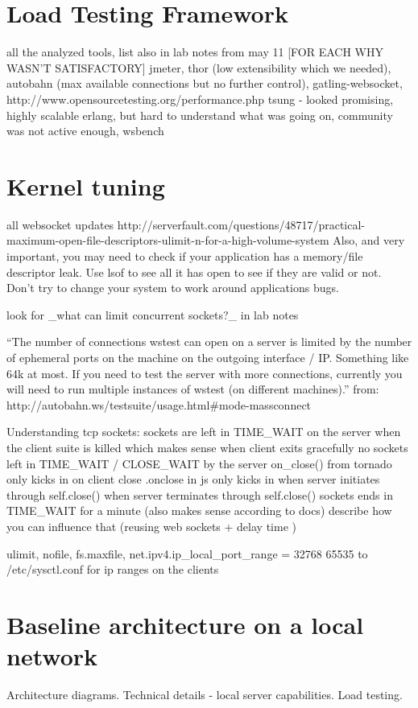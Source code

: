 \documentclass{uvamscse}
\begin{document}
\section{Load Testing Framework}\label{Load Testing Framework}
all the analyzed tools, list also in lab notes from may 11 [FOR EACH WHY WASN'T SATISFACTORY]
jmeter, thor (low extensibility which we needed), autobahn (max available connections but no further control),
gatling-websocket, http://www.opensourcetesting.org/performance.php
tsung - looked promising, highly scalable erlang, but hard to understand what was going on, community was not active enough, wsbench

\section{Kernel tuning}
all websocket updates
http://serverfault.com/questions/48717/practical-maximum-open-file-descriptors-ulimit-n-for-a-high-volume-system
Also, and very important, you may need to check if your application has a memory/file descriptor leak. Use lsof to see all it has open to see if they are valid or not. Don't try to change your system to work around applications bugs.

look for \_what can limit concurrent sockets?\_ in lab notes

“The number of connections wstest can open on a server is limited by the number of ephemeral ports on the machine on the outgoing interface / IP. Something like 64k at most. If you need to test the server with more connections, currently you will need to run multiple instances of wstest (on different machines).” from: http://autobahn.ws/testsuite/usage.html\#mode-massconnect

Understanding tcp sockets:
sockets are left in TIME\_WAIT on the server when the client suite is killed which makes sense
when client exits gracefully no sockets left in TIME\_WAIT / CLOSE\_WAIT by the server
on\_close() from tornado only kicks in on client close
.onclose in js only kicks in when server initiates through self.close()
when server terminates through self.close() sockets ends in TIME\_WAIT for a minute (also makes sense according to docs)
describe how you can influence that (reusing web sockets + delay time )

ulimit, nofile, fs.max\-file, net.ipv4.ip\_local\_port\_range = 32768 65535  to /etc/sysctl.conf for ip ranges on the clients

\section{Baseline architecture on a local network}
Architecture diagrams.
Technical details - local server capabilities.
Load testing.
\end{document}
